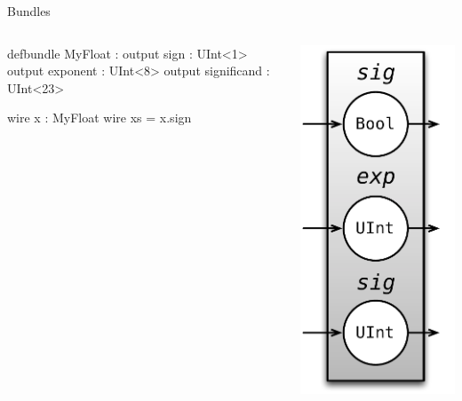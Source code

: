 \documentclass[xcolor=pdflatex,dvipsnames,table]{beamer}
\begin{document}
\begin{frame}[fragile]{Bundles}

\begin{columns}
\begin{stanza}
defbundle MyFloat :
  output sign : UInt<1>
  output exponent : UInt<8>
  output significand : UInt<23>

wire x  : MyFloat
wire xs = x.sign
\end{stanza}


\begin{center}
\includegraphics[height=0.9\textheight]{figs/myfloat.pdf} 
\end{center}

\end{columns}
\end{frame}
\end{document}
